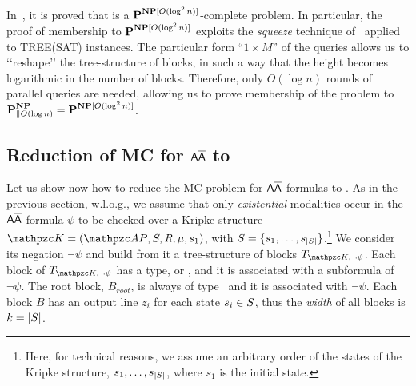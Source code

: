 In~\cite{schnoebelen2003}, it is proved that \TBSATM{} is a $\textbf{P}^{\textbf{NP}[O(\log^2 n)]}$-complete problem. In particular, the proof of membership to $\textbf{P}^{\textbf{NP}[O(\log^2 n)]}$ exploits the \emph{squeeze} technique of~\cite{gottlob1995} applied to TREE(SAT) instances.  The particular form ``$1\times M$'' of the queries allows us to \lq\lq reshape\rq\rq{} the tree-structure of blocks, in such a way that the height becomes logarithmic in the number of blocks. Therefore, only $O(\log n)$ rounds of parallel queries are needed, allowing us to prove membership of the problem to $\textbf{P}^{\textbf{NP}}_{\parallel O(\log n)}=\textbf{P}^{\textbf{NP}[O(\log^2 n)]}$.


\subsection{Reduction of MC for $\mathsf{A\overline{A}}$ to \TBSATM }
Let us show now how to reduce the MC problem for $\mathsf{A\overline{A}}$ formulas to \TBSATM . 
As in the previous section, w.l.o.g., we assume that  only \emph{existential} modalities occur 
in the $\mathsf{A\overline{A}}$ formula $\psi$ to be checked over a Kripke structure $\Ku=(\Prop,\States,\Edges,\Lab,s_1)$, 
with $S=\{s_1,\ldots , s_{|S|}\}$.\footnote{Here, for technical reasons, we assume an arbitrary order of the states of the Kripke structure, $s_1,\ldots , s_{|S|}$, where $s_1$ is the initial state.}
We consider its negation $\neg\psi$ and build from it a tree-structure of blocks $T_{\Ku,\neg\psi}$.
%
Each block of $T_{\Ku,\neg\psi}$ has a type, \forw{} or \back, and it is associated with a subformula of $\neg\psi$. The root block, $B_{root}$, is always of type \forw\ and it is associated with $\neg\psi$. Each block $B$ has an output line $z_i$ for each state $s_i\in S$, thus the \emph{width} of all blocks is $k=|S|$.

